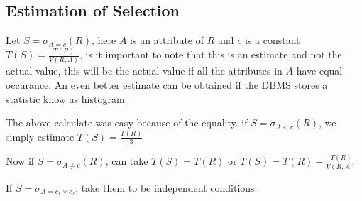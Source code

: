 \subsection{Estimation of Selection}
Let $S = \sigma_{A=c}(R)$, here $A$ is an attribute of $R$ and $c$ is a constant\\
$T(S)=\frac{T(R)}{V(R,A)}$, is it important to note that this is an estimate and not the actual value, this will be the actual value if all the attributes in $A$ have equal occurance. An even better estimate can be obtained if the DBMS stores a statistic know as histogram. 
\par The above calculate was easy because of the equality. if $S=\sigma_{A < c}(R)$, we simply estimate $T(S)=\frac{T(R)}{3}$
\par Now if $S=\sigma_{A\neq c}(R)$, can take $T(S)=T(R)$ or $T(S)= T(R) - \frac{T(R)}{V(R,A)}$
\par If $S=\sigma_{A = c_1 \lor c_2}$, take them to be independent conditions.

